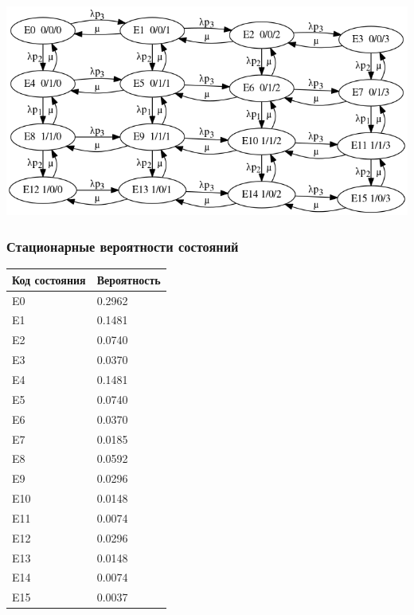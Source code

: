 \includegraphics[resolution=128]{img/g2.png}

\subsubsection{Стационарные вероятности состояний}

\begin{tabular}{|l|l|}
\hline
Код состояния & Вероятность \\ \hline
E0            & 0.2962      \\ \hline
E1            & 0.1481      \\ \hline
E2            & 0.0740      \\ \hline
E3            & 0.0370      \\ \hline
E4            & 0.1481      \\ \hline
E5            & 0.0740      \\ \hline
E6            & 0.0370      \\ \hline
E7            & 0.0185      \\ \hline
E8            & 0.0592      \\ \hline
E9            & 0.0296      \\ \hline
E10           & 0.0148      \\ \hline
E11           & 0.0074      \\ \hline
E12           & 0.0296      \\ \hline
E13           & 0.0148      \\ \hline
E14           & 0.0074      \\ \hline
E15           & 0.0037      \\ \hline
\end{tabular}

